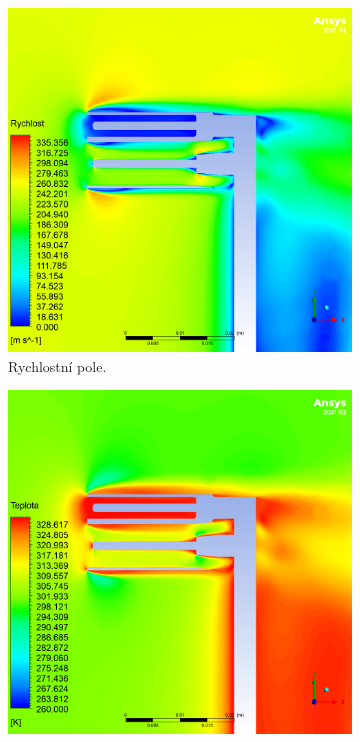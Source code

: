             \begin{figure}[ht!]
                \centering
                \begin{subfigure}{0.45\textwidth}
                    \centering
                    \captionsetup{width=.9\linewidth}
                    \includegraphics[width=\textwidth]{500_FINAL/SIM_Final_XY0_rychlost.png}
                    \caption{Rychlostní pole.}
                \end{subfigure}
                \begin{subfigure}{0.45\textwidth}
                    \centering
                    \captionsetup{width=.9\linewidth}
                    \includegraphics[width=\textwidth]{500_FINAL/SIM_Final_XY0_teplota.png}

\end{subfigure}
\end{figure}
